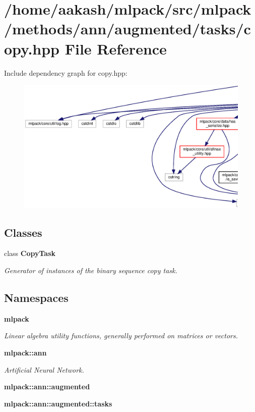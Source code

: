 \section{/home/aakash/mlpack/src/mlpack/methods/ann/augmented/tasks/copy.hpp File Reference}
\label{copy_8hpp}
Include dependency graph for copy.\+hpp\+:
\nopagebreak
\begin{figure}[H]
\begin{center}
\leavevmode
\includegraphics[width=350pt]{copy_8hpp__incl}
\end{center}
\end{figure}
\subsection*{Classes}
\begin{DoxyCompactItemize}
\item 
class \textbf{ Copy\+Task}
\begin{DoxyCompactList}\small\item\em Generator of instances of the binary sequence copy task. \end{DoxyCompactList}\end{DoxyCompactItemize}
\subsection*{Namespaces}
\begin{DoxyCompactItemize}
\item 
 \textbf{ mlpack}
\begin{DoxyCompactList}\small\item\em Linear algebra utility functions, generally performed on matrices or vectors. \end{DoxyCompactList}\item 
 \textbf{ mlpack\+::ann}
\begin{DoxyCompactList}\small\item\em Artificial Neural Network. \end{DoxyCompactList}\item 
 \textbf{ mlpack\+::ann\+::augmented}
\item 
 \textbf{ mlpack\+::ann\+::augmented\+::tasks}
\end{DoxyCompactItemize}


